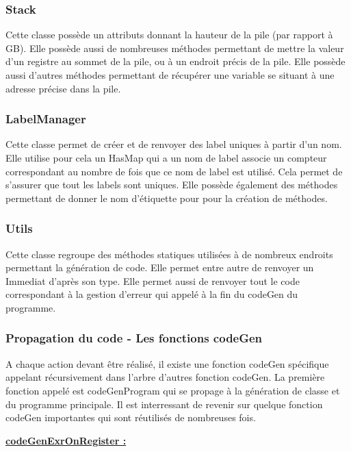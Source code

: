 \documentclass[12pt, a4paper, one side]{article}
\begin{document}
    \subsubsection{Stack}

    Cette classe possède un attributs donnant la hauteur de la pile (par rapport à GB). Elle possède aussi
    de nombreuses méthodes permettant de mettre la valeur d'un registre au sommet de la pile, ou à un
    endroit précis de la pile. Elle possède aussi d'autres méthodes permettant de récupérer une variable
    se situant à une adresse précise dans la pile.

    \subsubsection{LabelManager}

    Cette classe permet de créer et de renvoyer des label uniques à partir d'un nom. Elle utilise pour cela un HasMap
    qui a un nom de label associe un compteur correspondant au nombre de fois que ce nom de label est utilisé. Cela
    permet de s'assurer que tout les labels sont uniques. Elle possède également des méthodes permettant de donner le nom d'étiquette pour pour la création de méthodes.

    \subsubsection{Utils}

    Cette classe regroupe des méthodes statiques utilisées à de nombreux endroits permettant la génération
    de code. Elle permet entre autre de renvoyer un Immediat d'après son type. Elle permet aussi de renvoyer tout
    le code correspondant à la gestion d'erreur qui appelé à la fin du codeGen du programme.

    \subsubsection{Propagation du code - Les fonctions codeGen}

    A chaque action devant être réalisé, il existe une fonction codeGen spécifique appelant récursivement dans l'arbre
    d'autres fonction codeGen. La première fonction appelé est codeGenProgram qui se propage à la génération de classe
    et du programme principale. Il est interressant de revenir sur quelque fonction codeGen importantes qui sont réutilisés
    de nombreuses fois.

    \medskip
    \textbf{\underline{codeGenExrOnRegister :}}
\end{document}
